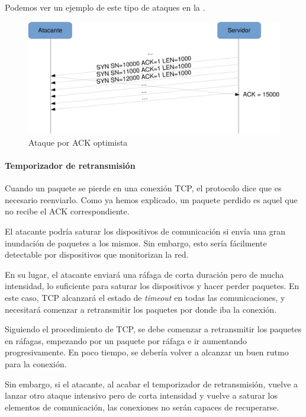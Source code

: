 Podemos ver un ejemplo de este tipo de ataques en la .

\begin{figure}[htbp]
\centering
\includegraphics[width=\textwidth]{CapituloDDoS/Figuras/optim_ACK_attack}
\caption{Ataque por ACK optimista}
\end{figure}
%

\paragraph{Temporizador de retransmisión}\mbox{\newline}

Cuando un paquete se pierde en una conexión \gls{TCP}, el protocolo dice que es necesario reenviarlo. Como ya hemos 
explicado, un paquete perdido es aquel que no recibe el \gls{ACK} correspondiente.

El atacante podría saturar los dispositivos de comunicación si envía una gran inundación de paquetes a los mismos. Sin 
embargo, esto sería fácilmente detectable por dispositivos que monitorizan la red.

En su lugar, el atacante enviará una ráfaga de corta duración pero de mucha intensidad, lo suficiente para saturar los 
dispositivos y hacer perder paquetes. En este caso, \gls{TCP} alcanzará el estado de \emph{timeout} en todas las 
comunicaciones, y necesitará comenzar a retransmitir los paquetes por donde iba la conexión.

Siguiendo el procedimiento de \gls{TCP}, se debe comenzar a retransmitir los paquetes en ráfagas, empezando por un 
paquete por ráfaga e ir aumentando progresivamente. En poco tiempo, se debería volver a alcanzar un buen rutmo para la 
conexión.

Sin embargo, si el atacante, al acabar el temporizador de retransmisión, vuelve a lanzar otro ataque intensivo pero de 
corta intensidad y vuelve a saturar los elementos de comunicación, las conexiones no serán capaces de recuperarse.

